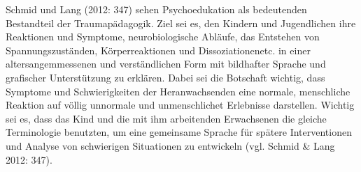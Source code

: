Schmid und Lang (2012: 347) sehen Psychoedukation als bedeutenden Bestandteil der Traumap{\"a}dagogik. Ziel sei es, den Kindern und Jugendlichen ihre Reaktionen und Symptome, neurobiologische Abl{\"a}ufe, das Entstehen von Spannungszust{\"a}nden, K{\"o}rperreaktionen und Dissoziationen\footnotemark etc. in einer altersangemmessenen und verständlichen Form mit bildhafter Sprache und grafischer Unterstützung zu erklären. Dabei sei die Botschaft wichtig, dass Symptome und Schwierigkeiten der Heranwachsenden eine normale, menschliche Reaktion auf v{\"o}llig unnormale und unmenschlichet Erlebnisse darstellen. Wichtig sei es, dass das Kind und die mit ihm arbeitenden Erwachsenen die gleiche Terminologie benutzten, um eine gemeinsame Sprache für spätere Interventionen und Analyse von schwierigen Situationen zu entwickeln (vgl. Schmid \& Lang 2012: 347).


